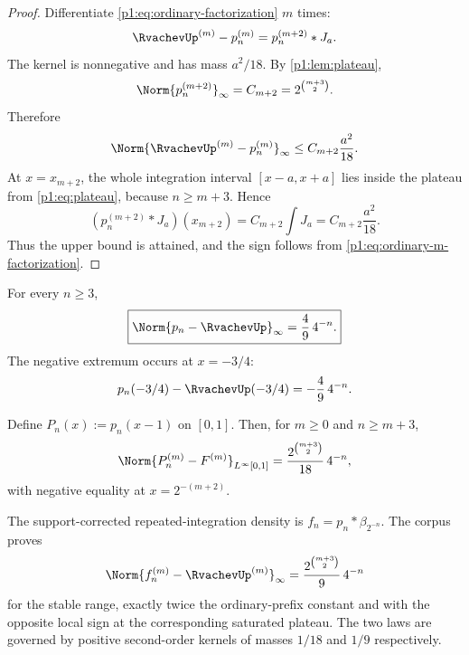 \documentclass[11pt]{article}
\numberwithin{equation}{section}
\theoremstyle{definition}
\theoremstyle{remark}
\begin{document}
\begin{proof}
Differentiate \eqref{p1:eq:ordinary-factorization} $m$ times:
\begin{equation}
 \RvachevUp^{(m)}-p_n^{(m)}=p_n^{(m+2)}*J_a.
 \label{p1:eq:ordinary-m-factorization}
\end{equation}
The kernel is nonnegative and has mass $a^2/18$.  By \cref{p1:lem:plateau},
\[
 \Norm{p_n^{(m+2)}}_\infty=C_{m+2}=2^{\binom{m+3}{2}}.
\]
Therefore
\[
 \Norm{\RvachevUp^{(m)}-p_n^{(m)}}_\infty
 \le C_{m+2}\frac{a^2}{18}.
\]
At $x=x_{m+2}$, the whole integration interval
\([x-a,x+a]\) lies inside the plateau from \eqref{p1:eq:plateau}, because $n\ge m+3$.  Hence
\[
 (p_n^{(m+2)}*J_a)(x_{m+2})
 =C_{m+2}\int J_a
 =C_{m+2}\frac{a^2}{18}.
\]
Thus the upper bound is attained, and the sign follows from \eqref{p1:eq:ordinary-m-factorization}.
\end{proof}

\begin{corollary}
\label{p1:cor:ordinary-uniform}
For every $n\ge3$,
\begin{equation}
 \boxed{\Norm{p_n-\RvachevUp}_\infty=\frac49\,4^{-n}.}
 \label{p1:eq:ordinary-uniform}
\end{equation}
The negative extremum occurs at $x=-3/4$:
\begin{equation}
 p_n(-3/4)-\RvachevUp(-3/4)=-\frac49\,4^{-n}.
 \label{p1:eq:ordinary-at-34}
\end{equation}
\end{corollary}

\begin{corollary}
\label{p1:cor:F-ordinary}
Define $P_n(x):=p_n(x-1)$ on $[0,1]$.  Then, for $m\ge0$ and $n\ge m+3$,
\begin{equation}
 \Norm{P_n^{(m)}-F^{(m)}}_{L^\infty[0,1]}
 =\frac{2^{\binom{m+3}{2}}}{18}\,4^{-n},
 \label{p1:eq:F-ordinary}
\end{equation}
with negative equality at $x=2^{-(m+2)}$.
\end{corollary}

\begin{remark}
The support-corrected repeated-integration density is
\(f_n=p_n*\beta_{2^{-n}}\).  The corpus proves
\[
 \Norm{f_n^{(m)}-\RvachevUp^{(m)}}_\infty
 =\frac{2^{\binom{m+3}{2}}}{9}\,4^{-n}
\]
for the stable range, exactly twice the ordinary-prefix constant and with the opposite local sign at the corresponding saturated plateau.  The two laws are governed by positive second-order kernels of masses $1/18$ and $1/9$ respectively.
\end{remark}
\end{document}

